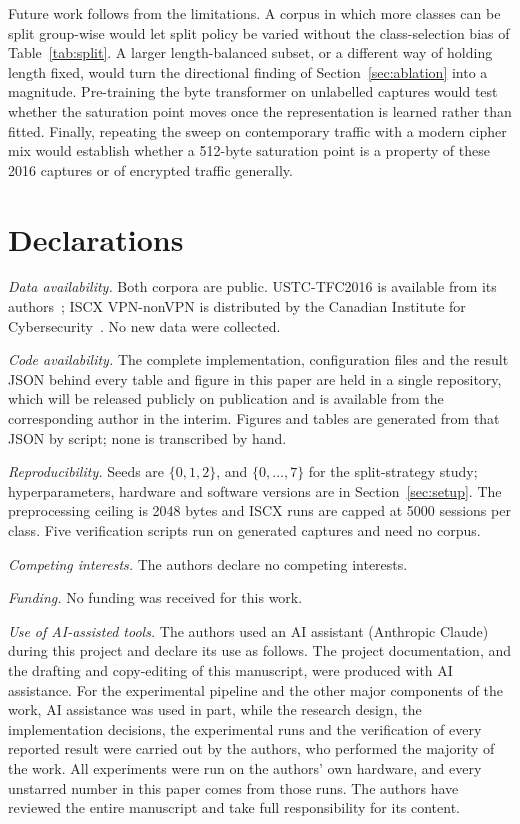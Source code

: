 \documentclass[pdflatex,sn-mathphys-num]{sn-jnl}
\theoremstyle{thmstyleone}%
\theoremstyle{thmstylethree}%
\begin{document}
Future work follows from the limitations. A corpus in which more classes can be
split group-wise would let split policy be varied without the class-selection
bias of Table~\ref{tab:split}. A larger length-balanced subset, or a different
way of holding length fixed, would turn the directional finding of
Section~\ref{sec:ablation} into a magnitude. Pre-training the byte transformer
on unlabelled captures would test whether the saturation point moves once the
representation is learned rather than fitted. Finally, repeating the sweep on
contemporary traffic with a modern cipher mix would establish whether a
512-byte saturation point is a property of these 2016 captures or of encrypted
traffic generally.



\section*{Declarations}\label{sec:declarations}

\emph{Data availability.} Both corpora are public. USTC-TFC2016 is available
from its authors~\cite{ustc}; ISCX VPN-nonVPN is distributed by the Canadian
Institute for Cybersecurity~\cite{iscx}. No new data were collected.

\emph{Code availability.} The complete implementation, configuration files
and the result JSON behind every table and figure in this paper are held in a
single repository, which will be released publicly on publication and is
available from the corresponding author in the interim. Figures and tables are
generated from that JSON by script; none is transcribed by hand.

\emph{Reproducibility.} Seeds are $\{0,1,2\}$, and $\{0,\dots,7\}$ for the
split-strategy study; hyperparameters, hardware and software versions are in
Section~\ref{sec:setup}. The preprocessing ceiling is 2048 bytes and ISCX runs
are capped at 5000 sessions per class. Five verification scripts run on
generated captures and need no corpus.

\emph{Competing interests.} The authors declare no competing interests.

\emph{Funding.} No funding was received for this work.

\emph{Use of AI-assisted tools.} The authors used an AI assistant (Anthropic
Claude) during this project and declare its use as follows. The project
documentation, and the drafting and copy-editing of this manuscript, were
produced with AI assistance. For the experimental pipeline and the other major
components of the work, AI assistance was used in part, while the research
design, the implementation decisions, the experimental runs and the
verification of every reported result were carried out by the authors, who
performed the majority of the work. All experiments were run on the authors'
own hardware, and every unstarred number in this paper comes from those runs.
The authors have reviewed the entire manuscript and take full responsibility
for its content.
\end{document}
